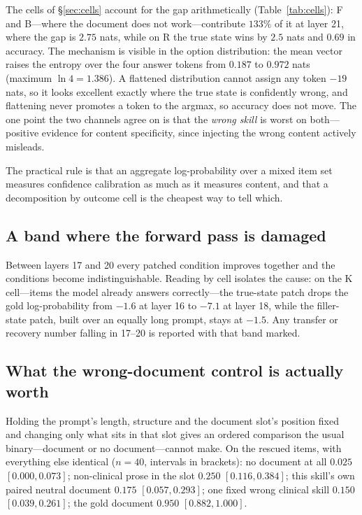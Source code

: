 \documentclass{article}
\begin{document}
The cells of \S\ref{sec:cells} account for the gap arithmetically
(Table~\ref{tab:cells}): F and B---where the document does not work---contribute
$133\%$ of it at layer 21, where the gap is $2.75$ nats, while on R the true state wins by $2.5$ nats and $0.69$ in
accuracy. The mechanism is visible in the option distribution: the mean vector
raises the entropy over the four answer tokens from $0.187$ to $0.972$ nats
(maximum $\ln 4 = 1.386$). A flattened distribution cannot assign any token
$-19$ nats, so it looks excellent exactly where the true state is confidently
wrong, and flattening never promotes a token to the argmax, so accuracy does not
move. The one point the two channels agree on is that the \emph{wrong skill} is
worst on both---positive evidence for content specificity, since injecting the
wrong content actively misleads.

The practical rule is that an aggregate log-probability over a mixed item set
measures confidence calibration as much as it measures content, and that a
decomposition by outcome cell is the cheapest way to tell which.

\subsection{A band where the forward pass is damaged}

Between layers 17 and 20 every patched condition improves together and the
conditions become indistinguishable. Reading by cell isolates the cause: on the
K cell---items the model already answers correctly---the true-state patch drops
the gold log-probability from $-1.6$ at layer 16 to $-7.1$ at layer 18, while
the filler-state patch, built over an equally long prompt, stays at $-1.5$. Any
transfer or recovery number falling in 17--20 is reported with that band marked.

\subsection{What the wrong-document control is actually worth}
\label{sec:plausible}


Holding the prompt's length, structure and the document slot's position fixed and
changing only what sits in that slot gives an ordered comparison the usual
binary---document or no document---cannot make. On the rescued items, with
everything else identical ($n=40$, intervals in brackets): no document at all
$0.025$ $[0.000, 0.073]$; non-clinical prose in the slot $0.250$
$[0.116, 0.384]$; this skill's own paired neutral document $0.175$
$[0.057, 0.293]$; one fixed wrong clinical skill $0.150$ $[0.039, 0.261]$; the
gold document $0.950$ $[0.882, 1.000]$.
\end{document}
